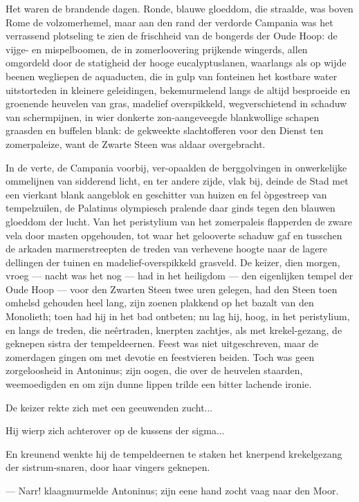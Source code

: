 \documentclass[a4paper, 12pt, oneside, dutch]{article}
\begin{document}
Het waren de brandende dagen. Ronde, blauwe gloeddom, die straalde, was boven Rome de volzomerhemel, maar aan den rand der verdorde Campania was het verrassend plotseling te zien de frischheid van de bongerds der Oude Hoop: de vijge- en mispelboomen, de in zomerloovering prijkende wingerds, allen omgordeld door de statigheid der hooge eucalyptuslanen, waarlangs als op wijde beenen wegliepen de aquaducten, die in gulp van fonteinen het kostbare water uitstorteden in kleinere geleidingen, bekemurmelend langs de altijd besproeide en groenende heuvelen van gras, madelief overspikkeld, wegverschietend in schaduw van schermpijnen, in wier donkerte zon-aangeveegde blankwollige schapen graasden en buffelen blank: de gekweekte slachtofferen voor den Dienst ten zomerpaleize, want de Zwarte Steen was aldaar overgebracht.

In de verte, de Campania voorbij, ver-opaalden de berggolvingen in onwerkelijke ommelijnen van sidderend licht, en ter andere zijde, vlak bij, deinde de Stad met een vierkant blank aangeblok en geschitter van huizen en fel òpgestreep van tempelzuilen, de Palatinus olympiesch pralende daar ginds tegen den blauwen gloeddom der lucht. Van het peristylium van het zomerpaleis flapperden de zware vela door masten opgehouden, tot waar het gelooverte schaduw gaf en tusschen de arkaden marmerstreepten de treden van verhevene hoogte naar de lagere dellingen der tuinen en madelief-overspikkeld grasveld. De keizer, dien morgen, vroeg --- nacht was het nog --- had in het heiligdom --- den eigenlijken tempel der Oude Hoop --- voor den Zwarten Steen twee uren gelegen, had den Steen toen omhelsd gehouden heel lang, zijn zoenen plakkend op het bazalt van den Monolieth; toen had hij in het bad ontbeten; nu lag hij, hoog, in het peristylium, en langs de treden, die neêrtraden, knerpten zachtjes, als met krekel-gezang, de geknepen sistra der tempeldeernen. Feest was niet uitgeschreven, maar de zomerdagen gingen om met devotie en feestvieren beiden. Toch was geen zorgeloosheid in Antoninus; zijn oogen, die over de heuvelen staarden, weemoedigden en om zijn dunne lippen trilde een bitter lachende ironie.

De keizer rekte zich met een geeuwenden zucht...

Hij wierp zich achterover op de kussens der sigma...

En kreunend wenkte hij de tempeldeernen te staken het knerpend krekelgezang der sistrum-snaren, door haar vingers geknepen.

--- Narr! klaagmurmelde Antoninus; zijn eene hand zocht vaag naar den Moor.
\end{document}
